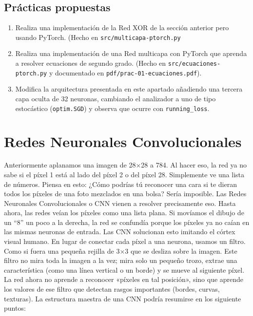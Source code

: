 \documentclass[a4paper,11pt]{article}
\begin{document}
\subsection{Prácticas propuestas}

\begin{enumerate}
\item Realiza una implementación de la Red XOR de la sección anterior pero
  usando PyTorch. (Hecho en \texttt{src/multicapa-ptorch.py}

\item Realiza una implementación de una Red multicapa con PyTorch que aprenda a
  resolver ecuaciones de segundo grado. (Hecho en
  \texttt{src/ecuaciones-ptorch.py} y documentado en \texttt{pdf/prac-01-ecuaciones.pdf}).

\item
  Modifica la arquitectura presentada en este apartado añadiendo una tercera
  capa oculta de 32 neuronas, cambiando el analizador a uno de tipo estocástico
  (\texttt{optim.SGD}) y observa que ocurre con \texttt{running\_loss}.

\end{enumerate}













\newpage
\section{Redes Neuronales Convolucionales}

Anteriormente aplanamos una imagen de 28×28 a 784. Al hacer eso, la red
ya no sabe si el píxel 1 está al lado del píxel 2 o del píxel 28.
Simplemente ve una lista de números. Piensa en esto: ¿Cómo podrías tú
reconocer una cara si te dieran todos los píxeles de una foto mezclados
en una bolsa? Sería imposible. Las Redes Neuronales Convolucionales o
CNN vienen a resolver precisamente eso. Hasta ahora, las redes veían los
píxeles como una lista plana. Si movíamos el dibujo de un ``8'' un poco
a la derecha, la red se confundía porque los píxeles ya no caían en las
mismas neuronas de entrada. Las CNN solucionan esto imitando el córtex
visual humano. En lugar de conectar cada píxel a una neurona, usamos un
filtro. Como si fuera una pequeña rejilla de 3×3 que se desliza sobre la
imagen. Este filtro no mira toda la imagen a la vez; mira solo un
pequeño trozo, extrae una característica (como una línea vertical o un
borde) y se mueve al siguiente píxel. La red ahora no aprende a
reconocer «píxeles en tal posición», sino que aprende los valores de ese
filtro que detectan rasgos importantes (bordes, curvas, texturas). La
estructura maestra de una CNN podría resumirse en los siguiente puntos:
\end{document}
